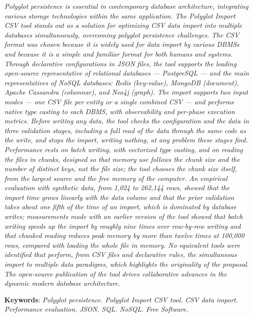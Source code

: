 \documentclass[
  12pt,
  oneside,
  a4paper,
  chapter=TITLE,
  section=TITLE,
  english,
  brazil,
]{abntex2}
\begin{document}
\begin{resumo}

  \rmfamily\itshape
  Polyglot persistence is essential in contemporary database architecture, integrating
  various storage technologies within the same application. The \textit{Polyglot Import CSV}
  tool stands out as a solution for optimizing CSV data import into multiple databases
  simultaneously, overcoming polyglot persistence challenges. The CSV format was chosen
  because it is widely used for data import by various DBMSs and because it is a simple
  and familiar format for both humans and systems. Through declarative configurations in
  JSON files, the tool supports the leading open-source representative of relational
  databases --- PostgreSQL --- and the main representatives of NoSQL databases: Redis
  (key-value), MongoDB (document), Apache Cassandra (columnar), and Neo4j (graph). The
  import supports two input modes --- one CSV file per entity or a single combined CSV ---
  and performs native type casting to each DBMS, with observability and per-phase execution
  metrics. Before writing any data, the tool checks the configuration and the data in three
  validation stages, including a full read of the data through the same code as the write,
  and stops the import, writing nothing, at any problem these stages find. Performance rests
  on batch writing, with vectorized type casting, and on reading the files in chunks,
  designed so that memory use follows the chunk size and the number of distinct keys, not
  the file size; the tool chooses the chunk size itself, from the largest source and the
  free memory of the computer. An
  empirical evaluation with synthetic
  data, from 1,024 to 262,144 rows, showed that the import time grows linearly with the data
  volume and that the prior validation takes about one fifth of the time of an import, which
  is dominated by database writes; measurements made with an earlier version of the tool
  showed that batch writing speeds up the import by roughly nine times over row-by-row
  writing and that chunked reading reduces peak memory by more than twelve times at 100,000
  rows, compared with loading the whole file in memory. No equivalent tools were identified that perform, from CSV files and declarative
  rules, the simultaneous import to multiple data paradigms, which highlights the
  originality of the proposal. The open-source publication of the tool drives collaborative
  advances in the dynamic modern database architecture.

  \vspace{\onelineskip}

  \noindent
  {\rmfamily\upshape\textbf{Keywords}}: \textit{Polyglot persistence.
  Polyglot Import CSV tool. CSV data import. Performance evaluation. JSON. SQL. NoSQL.
  Free Software.}
\end{resumo}
\end{document}
